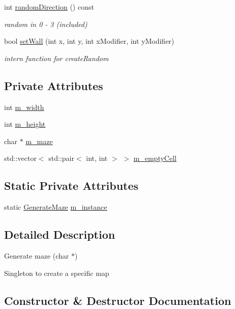 \begin{DoxyCompactItemize}
int \hyperlink{class_generate_maze_a2fee93d99775cd7f9cda479204fed46a}{random\+Direction} () const 
\begin{DoxyCompactList}\small\item\em random in 0 -\/ 3 (included) \end{DoxyCompactList}\item 
bool \hyperlink{class_generate_maze_a2ff0a651fad57900b159d854847966d4}{set\+Wall} (int x, int y, int x\+Modifier, int y\+Modifier)
\begin{DoxyCompactList}\small\item\em intern function for create\+Random \end{DoxyCompactList}\end{DoxyCompactItemize}
\subsection*{Private Attributes}
\begin{DoxyCompactItemize}
\item 
int \hyperlink{class_generate_maze_a0e05d9502767072ef2a613cf04cc9a20}{m\+\_\+width}
\item 
int \hyperlink{class_generate_maze_ac5c329940fd0c21779030d525884a792}{m\+\_\+height}
\item 
char $\ast$ \hyperlink{class_generate_maze_ac04e93698e6c2d8a3dc995eb592403e5}{m\+\_\+maze}
\item 
std\+::vector$<$ std\+::pair$<$ int, int $>$ $>$ \hyperlink{class_generate_maze_aa4689e1f2afaf68008f93f7ce6409882}{m\+\_\+empty\+Cell}
\end{DoxyCompactItemize}
\subsection*{Static Private Attributes}
\begin{DoxyCompactItemize}
\item 
static \hyperlink{class_generate_maze}{Generate\+Maze} \hyperlink{class_generate_maze_a1d2abbee3d246f1a657934fca6916c0f}{m\+\_\+instance}
\end{DoxyCompactItemize}


\subsection{Detailed Description}
Generate maze (char $\ast$) 

Singleton to create a specific map 

\subsection{Constructor \& Destructor Documentation}
\hypertarget{class_generate_maze_aab170aa3141ef70c69c8e753fba22468}{}

